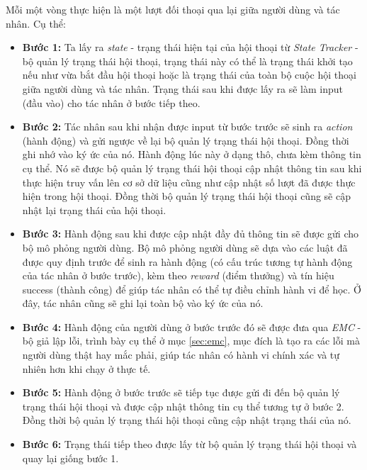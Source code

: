 Mỗi một vòng thực hiện là một lượt đối thoại qua lại giữa người dùng
và tác nhân. Cụ thể:

\begin{itemize}
    \item \textbf{Bước 1:} Ta lấy ra \textit{state} - trạng thái
    hiện tại của hội thoại từ \textit{State Tracker} - bộ quản lý
    trạng thái hội thoại, trạng thái này có thể là trạng thái
    khởi tạo nếu như vừa bắt đầu hội thoại hoặc là trạng thái của
    toàn bộ cuộc hội thoại giữa người dùng và tác nhân. Trạng thái
    sau khi được lấy ra sẽ làm input (đầu vào) cho tác nhân ở
    bước tiếp theo.
    \item \textbf{Bước 2:} Tác nhân sau khi nhận được input từ
    bước trước sẽ sinh ra \textit{action} (hành động) và gửi ngược về
    lại bộ quản lý trạng thái hội thoại. Đồng thời ghi nhớ vào ký ức
    của nó. Hành động lúc này ở dạng thô, chưa kèm thông tin cụ thể.
    Nó sẽ được bộ quản lý trạng thái hội thoại cập nhật thông tin
    sau khi thực hiện truy vấn lên cơ sở dữ liệu cũng như cập nhật
    số lượt đã được thực hiện trong hội thoại. Đồng thời bộ quản lý
    trạng thái hội thoại cũng sẽ cập nhật lại trạng thái của hội thoại.
    \item \textbf{Bước 3:} Hành động sau khi được cập nhật đầy đủ
    thông tin sẽ được gửi cho bộ mô phỏng người dùng. Bộ mô phỏng
    người dùng sẽ dựa vào các luật đã được quy định trước để sinh ra
    hành động (có cấu trúc tương tự hành động của tác nhân ở
    bước trước), kèm theo \textit{reward} (điểm thưởng) và tín hiệu
    success (thành công) để giúp tác nhân có thể tự điều chỉnh
    hành vi để học. Ở đây, tác nhân cũng sẽ ghi lại toàn bộ vào
    ký ức của nó.
    \item \textbf{Bước 4:} Hành động của người dùng ở bước trước đó
    sẽ được đưa qua \textit{EMC} - bộ giả lập lỗi, trình bày cụ thể ở
    mục \ref{sec:emc}, mục đích là tạo ra các lỗi mà người dùng thật
    hay mắc phải, giúp tác nhân có hành vi chính xác và tự nhiên hơn
    khi chạy ở thực tế.
    \item \textbf{Bước 5:} Hành động ở bước trước sẽ tiếp tục được
    gửi đi đến bộ quản lý trạng thái hội thoại và được cập nhật
    thông tin cụ thể tương tự ở bước 2. Đồng thời bộ quản lý
    trạng thái hội thoại cũng cập nhật trạng thái của nó.
    \item \textbf{Bước 6:} Trạng thái tiếp theo được lấy từ bộ
    quản lý trạng thái hội thoại và quay lại giống bước 1.
\end{itemize}

